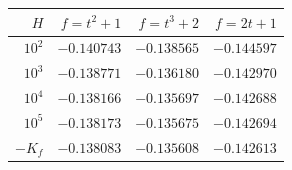 \begin{tabular}{@{}rrrr@{}}
\toprule
$H$ & $f=t^2+1$ & $f=t^3+2$ & $f=2t+1$ \\
\midrule
$10^{2}$ & $-0.140743$ & $-0.138565$ & $-0.144597$ \\
$10^{3}$ & $-0.138771$ & $-0.136180$ & $-0.142970$ \\
$10^{4}$ & $-0.138166$ & $-0.135697$ & $-0.142688$ \\
$10^{5}$ & $-0.138173$ & $-0.135675$ & $-0.142694$ \\
\midrule
$-K_f$ & $-0.138083$ & $-0.135608$ & $-0.142613$ \\
\bottomrule
\end{tabular}
